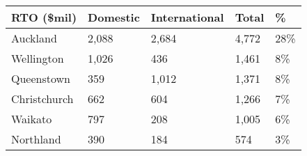 \begin{tabular}[t]{|p{2.95cm}|p{1cm}|p{1.5cm}|p{0.5cm}|p{0.5cm}|}
  \hline
RTO (\$mil) & Domestic & International & Total & \% \\ 
  \hline
Auckland & 2,088 & 2,684 & 4,772 & 28\% \\ 
  Wellington & 1,026 &   436 & 1,461 & 8\% \\ 
  Queenstown &   359 & 1,012 & 1,371 & 8\% \\ 
  Christchurch &   662 &   604 & 1,266 & 7\% \\ 
  Waikato &   797 &   208 & 1,005 & 6\% \\ 
  Northland &   390 &   184 &   574 & 3\% \\ 
   \hline
\end{tabular}

